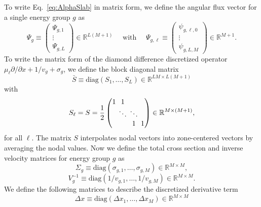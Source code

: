 
To write Eq.~\ref{eq:AlphaSlab} in matrix form, we define the angular flux vector for a single energy group $g$ as
\begin{equation}
\Psi_{g} \equiv 
\begin{pmatrix}
\Psi_{g,1} \\
\vdots \\
\Psi_{g,L}
\end{pmatrix} \in \mathbb{R}^{L(M+1)} \quad \text{ with } \quad
\Psi_{g, \ell} \equiv 
\begin{pmatrix}
\psi_{g,\ell,0} \\
\vdots \\
\psi_{g,L,M}
\end{pmatrix} \in \mathbb{R}^{M+1}.
\end{equation}
To write the matrix form of the diamond difference discretized operator $\mu_{\ell} \partial/\partial x + 1/v_{g} + \sigma_{g}$, we define the block diagonal matrix
\begin{equation}
\bar{S} \equiv \text{diag}(S_{1}, \dots, S_{L}) \in \mathbb{R}^{LM \times L(M+1)}
\end{equation}
with
\begin{equation}
S_{\ell} = S = \frac{1}{2}
\setlength\arraycolsep{2pt}
\begin{pmatrix}
1 & 1 & & \\
& \ddots & \ddots & \\
& & 1 & 1
\end{pmatrix} \in \mathbb{R}^{M \times (M+1)},
\end{equation}
for all $\ell$. The matrix $S$ interpolates nodal vectors into zone-centered vectors by averaging the nodal values. Now we define the total cross section and inverse velocity matrices for energy group $g$ as
\begin{equation}
	\Sigma_{g}  \equiv \text{diag}(\sigma_{g,1},\dots,\sigma_{g,M}) \in \mathbb{R}^{M \times M},
\end{equation}
\begin{equation}
	V^{-1}_{g}  \equiv \text{diag}(1/v_{g,1},\dots,1/v_{g,M}) \in \mathbb{R}^{M \times M}.
\end{equation}
We define the following matrices to describe the discretized derivative term
\begin{equation}
	\Delta x \equiv \text{diag}(\Delta x_{1}, \dots, \Delta x_{M}) \in \mathbb{R}^{M \times M}
\end{equation}
